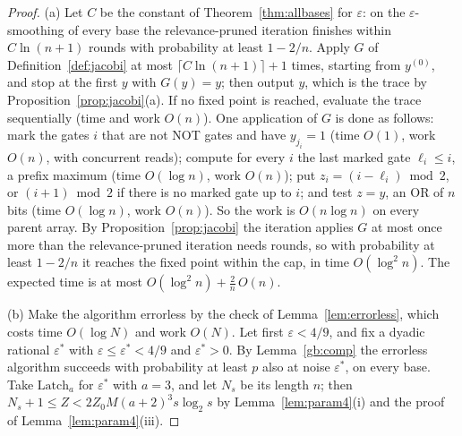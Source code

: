 \documentclass[11pt]{amsart}
\theoremstyle{definition}
\theoremstyle{remark}
\newcommand{\eps}{\varepsilon}
\begin{document}
\begin{proof}
(a) Let $C$ be the constant of Theorem~\ref{thm:allbases} for $\eps$: on the $\eps$-smoothing of
every base the relevance-pruned iteration finishes within $C\ln(n+1)$ rounds with probability at
least $1-2/n$. Apply $G$ of Definition~\ref{def:jacobi} at most $\lceil C\ln(n+1)\rceil+1$
times, starting from $y^{(0)}$, and stop at the first $y$ with $G(y)=y$; then output $y$, which is
the trace by Proposition~\ref{prop:jacobi}(a). If no fixed point is reached, evaluate the trace
sequentially (time and work $O(n)$). One application of $G$ is done as follows: mark the gates $i$
that are not NOT gates and have $y_{j_i}=1$ (time $O(1)$, work $O(n)$, with concurrent reads);
compute for every $i$ the last marked gate $\ell_i\le i$, a prefix maximum (time $O(\log n)$, work
$O(n)$); put $z_i=(i-\ell_i)\bmod2$, or $(i+1)\bmod2$ if there is no marked gate up to $i$; and
test $z=y$, an OR of $n$ bits (time $O(\log n)$, work $O(n)$). So the work is $O(n\log n)$ on every
parent array. By Proposition~\ref{prop:jacobi} the iteration applies $G$ at most once more than
the relevance-pruned iteration needs rounds, so with probability at least $1-2/n$ it reaches the
fixed point within the cap, in time $O(\log^2n)$. The expected time is at most
$O(\log^2n)+\frac2n\,O(n)$.

(b) Make the algorithm errorless by the check of Lemma~\ref{lem:errorless}, which costs time
$O(\log N)$ and work $O(N)$. Let first $\eps<4/9$, and fix a dyadic rational $\eps^*$ with $\eps\le\eps^*<4/9$ and $\eps^*>0$. By
Lemma~\ref{gb:comp} the errorless algorithm succeeds with probability at least $p$ also at noise
$\eps^*$, on every base. Take $\mathrm{Latch}_a$ for $\eps^*$ with $a=3$, and let $N_s$ be its
length $n$; then $N_s+1\le Z<2Z_0M(a+2)^3s\log_2s$ by Lemma~\ref{lem:param4}(i) and the proof of
Lemma~\ref{lem:param4}(iii).


\end{proof}
\end{document}
